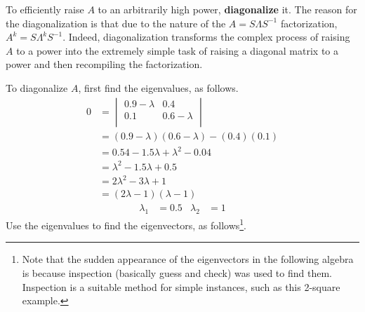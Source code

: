 \documentclass[titlepage]{article}
\begin{document}
To efficiently raise $A$ to an arbitrarily high power, \textbf{\gls{diagonalize}} it. The reason for the diagonalization is that due to the nature of the $A=S\Lambda S^{-1}$ factorization, $A^k=S\Lambda^kS^{-1}$. Indeed, diagonalization transforms the complex process of raising $A$ to a power into the extremely simple task of raising a diagonal matrix to a power and then recompiling the factorization.\par
To \gls{diagonalize} $A$, first find the eigenvalues, as follows.
\begin{align*}
    0 &=
    \begin{vmatrix}
        0.9-\lambda & 0.4\\
        0.1 & 0.6-\lambda\\
    \end{vmatrix}\\
    &= (0.9-\lambda)(0.6-\lambda)-(0.4)(0.1)\\
    &= 0.54-1.5\lambda+\lambda^2-0.04\\
    &= \lambda^2-1.5\lambda+0.5\\
    &= 2\lambda^2-3\lambda+1\\
    &= (2\lambda-1)(\lambda-1)
\end{align*}
\begin{align*}
    \lambda_1 &= 0.5&
        \lambda_2 &= 1
\end{align*}
Use the eigenvalues to find the eigenvectors, as follows\footnote{\label{fnt:inspection}Note that the sudden appearance of the eigenvectors in the following algebra is because inspection (basically guess and check) was used to find them. Inspection is a suitable method for simple instances, such as this 2-square example.}.
\end{document}
